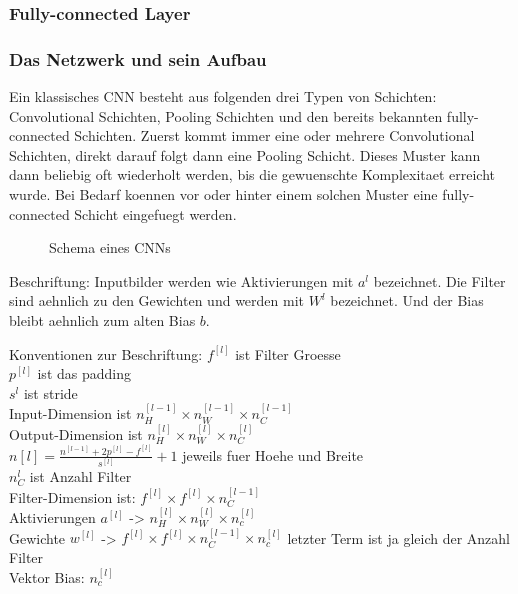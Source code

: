 \documentclass[../main]{subfiles}
\begin{document}
\subsubsection{Fully-connected Layer}

\subsubsection{Das Netzwerk und sein Aufbau}

Ein klassisches CNN besteht aus folgenden drei Typen von Schichten:
Convolutional Schichten, Pooling Schichten und den bereits bekannten
fully-connected Schichten.
Zuerst kommt immer eine oder mehrere Convolutional Schichten, direkt darauf
folgt dann eine Pooling Schicht. Dieses Muster kann dann beliebig oft
wiederholt werden, bis die gewuenschte Komplexitaet erreicht wurde.
Bei Bedarf koennen vor oder hinter einem solchen Muster eine fully-connected
Schicht eingefuegt werden.
\begin{figure}

  \caption{Schema eines CNNs}
\end{figure}

Beschriftung:
Inputbilder werden wie Aktivierungen mit $a^l$ bezeichnet.
Die Filter sind aehnlich zu den Gewichten und werden mit $W^l$ bezeichnet.
Und der Bias bleibt aehnlich zum alten Bias $b$.

Konventionen zur Beschriftung:
$f^{[l]}$ ist Filter Groesse\\
$p^{[l]}$ ist das padding\\
$s^{l}$ ist stride\\
Input-Dimension ist $n_H^{[l-1]} \times n_W^{[l-1]} \times n_C^{[l-1]}$\\
Output-Dimension ist $n_H^{[l]} \times n_W^{[l]} \times n_C^{[l]}$\\

$n[l] = \frac{n^{[l-1]} + 2p^{[l]} - f^{[l]}}{s^{[l]}} + 1$ jeweils fuer Hoehe
und Breite\\

$n_C^{l}$ ist Anzahl Filter\\

Filter-Dimension ist: $f^{[l]} \times f^{[l]} \times n_C^{[l-1]}$\\
Aktivierungen $a^{[l]}$ -> $n_H^{[l]} \times n_W^{[l]} \times n_c^{[l]}$\\
Gewichte $w^{[l]}$ -> $f^{[l]} \times f^{[l]} \times n_C^{[l-1]} \times
n_c^{[l]}$ letzter Term ist ja gleich der Anzahl Filter\\
Vektor Bias: $n_c^{[l]}$
\end{document}
